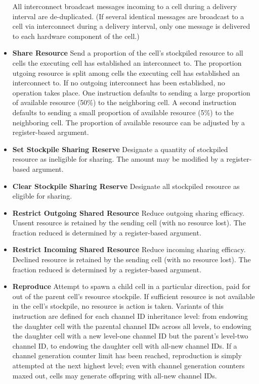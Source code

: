 \begin{itemize}
All interconnect broadcast messages incoming to a cell during a delivery interval are de-duplicated.
(If several identical messages are broadcast to a cell via interconnect during a delivery interval, only one message is delivered to each hardware component of the cell.)
\item \textbf{Share Resource}
Send a proportion of the cell's stockpiled resource to all cells the executing cell has established an interconnect to.
The proportion utgoing resource is split among cells the executing cell has established an interconnect to.
If no outgoing interconnect has been established, no operation takes place.
One instruction defaults to sending a large proportion of available resource (50\%) to the neighboring cell.
A second instruction defaults to sending a small proportion of available resource (5\%) to the neighboring cell.
The proportion of available resource can be adjusted by a register-based argument.
\item \textbf{Set Stockpile Sharing Reserve}
Designate a quantity of stockpiled resource as ineligible for sharing.
The amount may be modified by a register-based argument.
\item \textbf{Clear Stockpile Sharing Reserve}
Designate all stockpiled resource as eligible for sharing.
\item \textbf{Restrict Outgoing Shared Resource}
Reduce outgoing sharing efficacy.
Unsent resource is retained by the sending cell (with no resource lost).
The fraction reduced is determined by a register-based argument.
\item \textbf{Restrict Incoming Shared Resource}
Reduce incoming sharing efficacy.
Declined resource is retained by the sending cell (with no resource lost).
The fraction reduced is determined by a register-based argument.
\item \textbf{Reproduce}
Attempt to spawn a child cell in a particular direction, paid for out of the parent cell's resource stockpile.
If sufficient resource is not available in the cell's stockpile, no resource is action is taken.
Variants of this instruction are defined for each channel ID inheritance level: from endowing the daughter cell with the parental channel IDs across all levels, to endowing the daughter cell with a new level-one channel ID but the parent's level-two channel ID, to endowing the daughter cell with all-new channel IDs.
If a channel generation counter limit has been reached, reproduction is simply attempted at the next highest level; even with channel generation counters maxed out, cells may generate offspring with all-new channel IDs.

\end{itemize}

